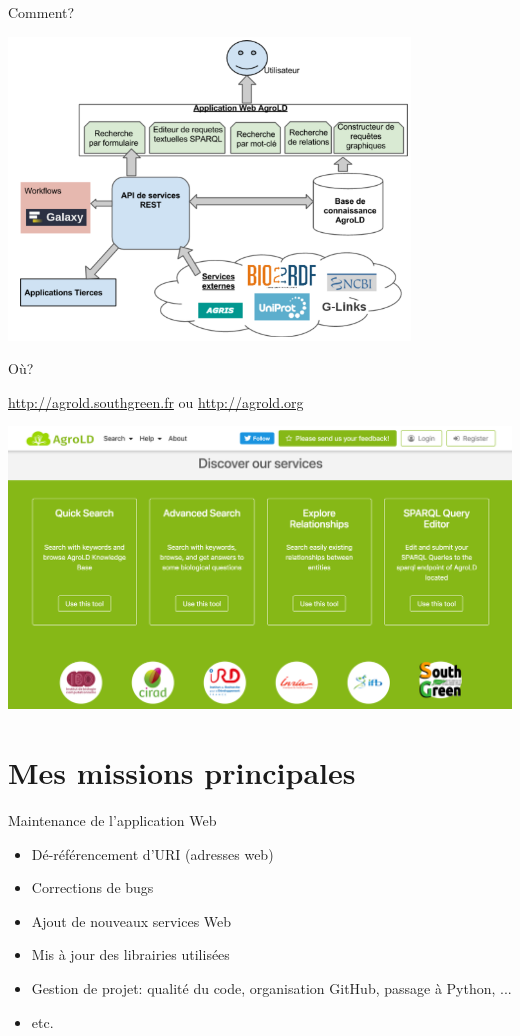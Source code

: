 \documentclass[newPxFont,pagenumber]{beamer}
\begin{document}
\begin{frame}{Comment?}

\centering \includegraphics[width=0.8\textwidth]{archAgrold.png}
\end{frame}

\begin{frame}{Où?}

\url{http://agrold.southgreen.fr} ou \url{http://agrold.org}

\centering \includegraphics[width=\textwidth]{webapp.png}
\end{frame}



\section{Mes missions principales}

\begin{frame}{Maintenance de l'application Web}

\begin{itemize}
	\item Dé-référencement d'URI (adresses web)
	\item Corrections de bugs
	\item Ajout de nouveaux services Web
	\item Mis à jour des librairies utilisées
	\item Gestion de projet: qualité du code, organisation GitHub, passage à Python, ...
	\item etc.
\end{itemize}
\end{frame}
\end{document}
